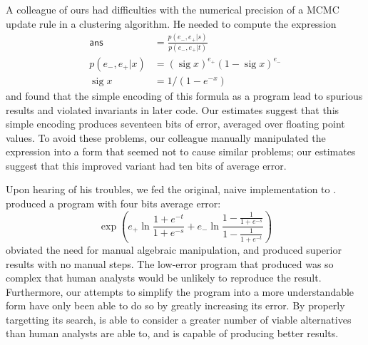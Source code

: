 \documentclass[paper.tex]{subfiles}
\begin{document}
A colleague of ours had difficulties with the numerical precision of a
MCMC update rule in a clustering algorithm.  He needed to compute the
expression
\begin{align*}
\mathsf{ans} &= \frac{p(e_-,e_+|s)}{p(e_-,e_+|t)} \\
p(e_-, e_+|x) &= (\operatorname{sig} x)^{e_+} (1 - \operatorname{sig} x)^{e_-} \\
\operatorname{sig}x &= 1 / (1 - e^{-x})
\end{align*}
and found that the simple encoding of this formula as a program lead
to spurious results and violated invariants in later code.  Our
estimates suggest that this simple encoding produces seventeen bits of
error, averaged over floating point values.  To avoid these problems,
our colleague manually manipulated the expression into a form that
seemed not to cause similar problems; our estimates suggest that this
improved variant had ten bits of average error.

Upon hearing of his troubles, we fed the original, naive
implementation to \casio.
\casio produced a program with four bits average error:
\begin{equation*}
  \operatorname{exp}\left(e_+\ln{\frac{1+e^{-t}}{1+e^{-s}}} +
     e_-\ln{\frac{1-\frac{1}{1+e^{-s}}}
                 {1-\frac{1}{1+e^{-t}}}}\right)
\end{equation*}
\casio obviated the need for manual algebraic manipulation, and
produced superior results with no manual steps.
The low-error program that \casio produced was so complex that human
analysts would be unlikely to reproduce the result.  Furthermore, our
attempts to simplify the program into a more understandable form have only been able to do so by greatly increasing
its error.  By properly targetting its search, \casio is able to
consider a greater number of viable alternatives than human analysts
are able to, and is capable of producing better results.
\end{document}
